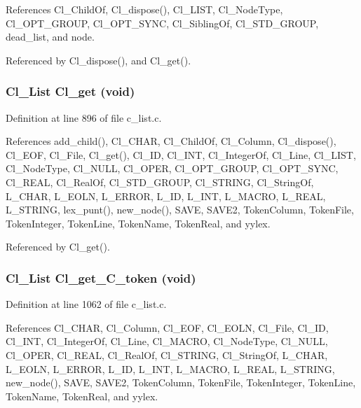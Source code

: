 References Cl\_\-Child\-Of, Cl\_\-dispose(), Cl\_\-LIST, Cl\_\-Node\-Type, Cl\_\-OPT\_\-GROUP, Cl\_\-OPT\_\-SYNC, Cl\_\-Sibling\-Of, Cl\_\-STD\_\-GROUP, dead\_\-list, and node.

Referenced by Cl\_\-dispose(), and Cl\_\-get().
\subsubsection{\setlength{\rightskip}{0pt plus 5cm}\bf{Cl\_\-List} Cl\_\-get (void)}\label{c__list_8h_68d9263d1c6e20abe1b4fc20c1c4e1d2}




Definition at line 896 of file c\_\-list.c.

References add\_\-child(), Cl\_\-CHAR, Cl\_\-Child\-Of, Cl\_\-Column, Cl\_\-dispose(), Cl\_\-EOF, Cl\_\-File, Cl\_\-get(), Cl\_\-ID, Cl\_\-INT, Cl\_\-Integer\-Of, Cl\_\-Line, Cl\_\-LIST, Cl\_\-Node\-Type, Cl\_\-NULL, Cl\_\-OPER, Cl\_\-OPT\_\-GROUP, Cl\_\-OPT\_\-SYNC, Cl\_\-REAL, Cl\_\-Real\-Of, Cl\_\-STD\_\-GROUP, Cl\_\-STRING, Cl\_\-String\-Of, L\_\-CHAR, L\_\-EOLN, L\_\-ERROR, L\_\-ID, L\_\-INT, L\_\-MACRO, L\_\-REAL, L\_\-STRING, lex\_\-punt(), new\_\-node(), SAVE, SAVE2, Token\-Column, Token\-File, Token\-Integer, Token\-Line, Token\-Name, Token\-Real, and yylex.

Referenced by Cl\_\-get().
\subsubsection{\setlength{\rightskip}{0pt plus 5cm}\bf{Cl\_\-List} Cl\_\-get\_\-C\_\-token (void)}\label{c__list_8h_89d793d5f6acdec1fe5b839464e2f6d2}




Definition at line 1062 of file c\_\-list.c.

References Cl\_\-CHAR, Cl\_\-Column, Cl\_\-EOF, Cl\_\-EOLN, Cl\_\-File, Cl\_\-ID, Cl\_\-INT, Cl\_\-Integer\-Of, Cl\_\-Line, Cl\_\-MACRO, Cl\_\-Node\-Type, Cl\_\-NULL, Cl\_\-OPER, Cl\_\-REAL, Cl\_\-Real\-Of, Cl\_\-STRING, Cl\_\-String\-Of, L\_\-CHAR, L\_\-EOLN, L\_\-ERROR, L\_\-ID, L\_\-INT, L\_\-MACRO, L\_\-REAL, L\_\-STRING, new\_\-node(), SAVE, SAVE2, Token\-Column, Token\-File, Token\-Integer, Token\-Line, Token\-Name, Token\-Real, and yylex.
